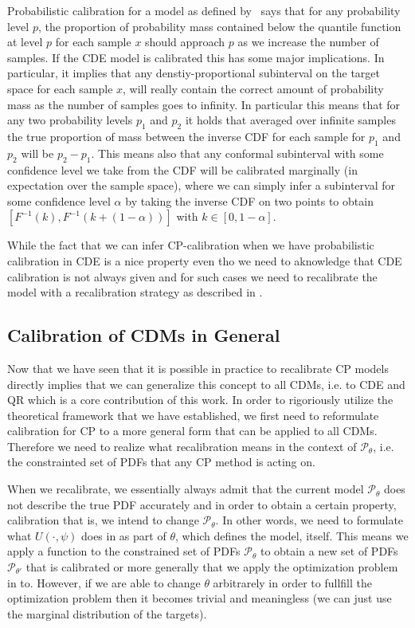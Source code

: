 Probabilistic calibration for a model as defined by~\cite{gneiting2007probabilistic} says that for any probability level $p$, the proportion of probability mass contained below the quantile function at level $p$ for each sample $x$ should approach $p$ as we increase the number of samples. If the CDE model is calibrated this has some major implications. In particular, it implies that any denstiy-proportional subinterval on the target space for each sample $x$, will really contain the correct amount of probability mass as the number of samples goes to infinity. In particular this means that for any two probability levels $p_1$ and $p_2$ it holds that averaged over infinite samples the true proportion of mass between the inverse CDF for each sample for $p_1$ and $p_2$ will be $p_2 - p_1$. This means also that any conformal subinterval with some confidence level we take from the CDF will be calibrated marginally (in expectation over the sample space), where we can simply infer a subinterval for some confidence level $\alpha$ by taking the inverse CDF on two points to obtain $[F^{-1}(k), F^{-1}(k + (1 - \alpha))]$ with $k \in [0, 1 - \alpha]$.

While the fact that we can infer CP-calibration when we have probabilistic calibration in CDE is a nice property even tho we need to aknowledge that CDE calibration is not always given and for such cases we need to recalibrate the model with a recalibration strategy as described in .

\subsection{Calibration of CDMs in General}\label{sec:calibration_cde_general}

Now that we have seen that it is possible in practice to recalibrate CP models  directly implies that we can generalize this concept to all CDMs, i.e. to CDE and QR which is a core contribution of this work. In order to rigoriously utilize the theoretical framework that we have established, we first need to reformulate calibration for CP to a more general form that can be applied to all CDMs. Therefore we need to realize what recalibration means in the context of $\mathscr{P}_{\theta}$, i.e. the constrainted set of PDFs that any CP method is acting on.

When we recalibrate, we essentially always admit that the current model $\mathscr{P}_{\theta}$ does not describe the true PDF accurately and in order to obtain a certain property, calibration that is, we intend to change $\mathscr{P}_{\theta}$. In other words, we need to formulate what $U(\cdot, \psi)$ does in  as part of $\theta$, which defines the model, itself. This means we apply a function to the constrained set of PDFs $\mathscr{P}_{\theta}$ to obtain a new set of PDFs $\mathscr{P}_{\theta'}$ that is calibrated or more generally that we apply the optimization problem in  to. However, if we are able to change $\theta$ arbitrarely in order to fullfill the optimization problem then it becomes trivial and meaningless (we can just use the marginal distribution of the targets).

